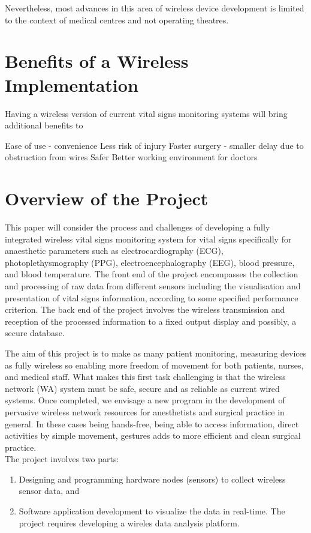 Nevertheless, most advances in this area of wireless device development is limited to the context of medical centres and not operating theatres.  

\section{Benefits of a Wireless Implementation}

Having a wireless version of current vital signs monitoring systems will bring additional benefits to 


Ease of use - convenience
Less risk of injury
Faster surgery - smaller delay due to obstruction from wires
Safer
Better working environment for doctors

\section{Overview of the Project}

This  paper will  consider the  process and challenges of  developing a fully integrated wireless vital signs monitoring system for vital signs specifically for anaesthetic parameters such as electrocardiography (ECG), photoplethysmography (PPG), electroencephalography (EEG), blood pressure, and blood temperature. The  front end of the project encompasses the collection and processing of raw data from different sensors including the visualisation and presentation of vital signs information,  according  to some specified performance criterion. The back end of the project involves the wireless transmission and reception of the processed information to a fixed output display and possibly, a secure database. 

The aim of this project is to make as many patient monitoring, measuring devices as fully wireless so enabling more freedom of movement for both patients, nurses, and medical staff. What makes this first task challenging is that the wireless network (WA) system must be safe, secure and as reliable as current wired systems. Once completed, we envisage a new program in the development of pervasive wireless network resources for anesthetists and surgical practice in general. In these cases being hands-free, being able to access information, direct activities by simple movement, gestures adds to more efficient and clean surgical practice. \\

The project involves two parts: 

\begin{enumerate}
	\item Designing and programming hardware nodes (sensors) to collect wireless sensor data, and 
	
	\item Software application development to visualize the data in real-time. The project requires developing a wireles data analysis platform.
\end{enumerate}


